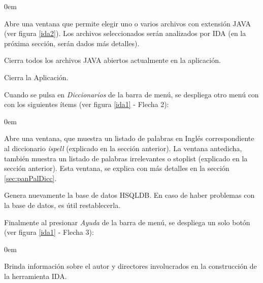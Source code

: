 \begin{description}
\itemsep0em%
\item[Abrir archivo(s) JAVA:] Abre una ventana que permite elegir uno o varios archivos con extensión JAVA (ver figura \ref{ida2}). Los archivos seleccionados serán analizados por IDA (en la próxima sección, serán dados más detalles).
\item[Cerrar Todo:] Cierra todos los archivos JAVA abiertos actualmente en la aplicación.
\item[Salir:] Cierra la Aplicación.
\end{description}

Cuando se pulsa en \textit{Diccionarios} de la barra de menú, se despliega otro menú con con los siguientes ítems (ver figura \ref{ida1} - Flecha 2):

\begin{description}
\itemsep0em%

\item[Ver Diccionarios:] Abre una ventana, que muestra un listado de palabras en Inglés correspondiente al diccionario \textit{ispell} (explicado en la sección anterior). %
La ventana antedicha, también muestra un listado de palabras irrelevantes o stoplist (explicado en la sección anterior). Esta ventana, se explica con más detalles en la sección \ref{sec:panPalDicc}.

\item[Restablecer B.D.(Base de Datos):] Genera nuevamente la base de datos HSQLDB. En caso de haber problemas con la base de datos, es útil restablecerla.

\end{description}

Finalmente al presionar \textit{Ayuda} de la barra de menú, se despliega un solo botón (ver figura \ref{ida1} - Flecha 3):

\begin{description}
\itemsep0em%
\item[Acerca de:] Brinda información sobre el autor y directores involucrados en la construcción de la herramienta IDA.
\end{description}

